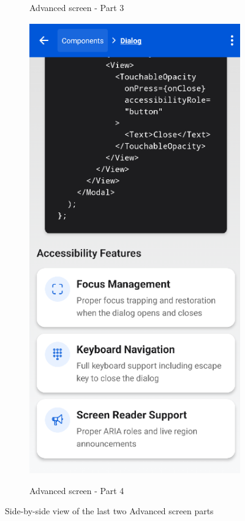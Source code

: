 \begin{figure}[ht]
\begin{subfigure}[b]{0.48\textwidth}
        \caption{Advanced screen - Part 3}
        \label{fig:advanced3-left}
    \end{subfigure}
    \hfill
    \begin{subfigure}[b]{0.48\textwidth}
        \centering
        \includegraphics[width=\linewidth, alt={Second part of the Dialog Screen}]{img/dialog2.png}
        \caption{Advanced screen - Part 4}
        \label{fig:advanced4-right}
    \end{subfigure}
    \caption{Side-by-side view of the last two Advanced screen parts}
    \label{fig:advanced_screens_sidebyside2}
\end{figure}

